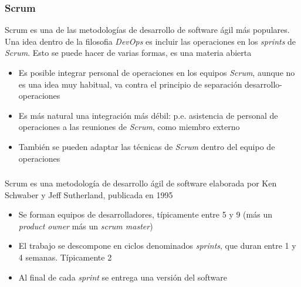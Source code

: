 \documentclass[ucs]{beamer}
\begin{document}
\begin{frame}[fragile]
\frametitle{Scrum}

Scrum es una de las metodologías de desarrollo de software ágil más populares.
Una idea dentro de la filosofia
\emph{DevOps}
es incluir las operaciones en los \emph{sprints} de 
\emph{Scrum}. Esto se puede hacer de varias formas, es una materia abierta

\begin{itemize}
\item
Es posible integrar personal de operaciones en los equipos 
\emph{Scrum}, aunque no es una idea muy habitual, va contra el principio
de separación desarrollo-operaciones

\item
Es más natural una integración más débil: p.e. asistencia de personal de operaciones
a las reuniones de 
\emph{Scrum}, 
como miembro externo

\item
También se pueden adaptar las técnicas de 
\emph{Scrum}
dentro del equipo de operaciones
\end{itemize}
\end{frame}



\begin{frame}[fragile]
\frametitle{}
Scrum es una metodología de desarrollo ágil de software elaborada por
Ken Schwaber y Jeff Sutherland, publicada en  1995
\begin{itemize}
\item
Se forman equipos de desarrolladores, típicamente  entre 5 y 9
(más un
\emph{product owner}
más un
\emph{scrum master})

\item
El trabajo se descompone en ciclos denominados \emph{sprints}, que duran
entre 1 y 4 semanas. Típicamente 2

\item
Al final
de cada
\emph{sprint}
se entrega una versión del software
\end{itemize}
\end{frame}
\end{document}
